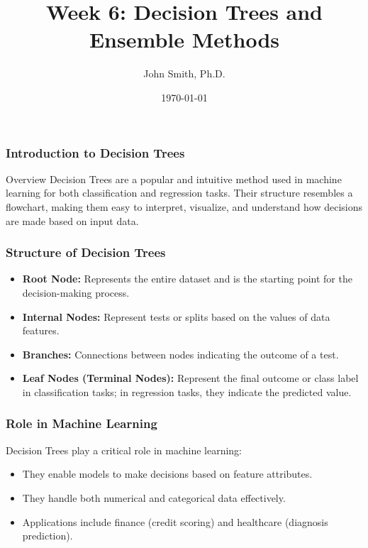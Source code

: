 \documentclass[aspectratio=169]{beamer}
\title[Decision Trees and Ensemble Methods]{Week 6: Decision Trees and Ensemble Methods}
\author[J. Smith]{John Smith, Ph.D.}
\institute[University Name]{
  Department of Computer Science\\
  University Name\\
  \vspace{0.3cm}
  Email: email@university.edu\\
  Website: www.university.edu
}
\date{\today}
\begin{document}
\frame{\titlepage}

\begin{frame}[fragile]
    \frametitle{Introduction to Decision Trees}
    \begin{block}{Overview}
        Decision Trees are a popular and intuitive method used in machine learning for both classification and regression tasks. Their structure resembles a flowchart, making them easy to interpret, visualize, and understand how decisions are made based on input data.
    \end{block}
\end{frame}

\begin{frame}[fragile]
    \frametitle{Structure of Decision Trees}
    \begin{itemize}
        \item \textbf{Root Node:} Represents the entire dataset and is the starting point for the decision-making process.
        \item \textbf{Internal Nodes:} Represent tests or splits based on the values of data features.
        \item \textbf{Branches:} Connections between nodes indicating the outcome of a test.
        \item \textbf{Leaf Nodes (Terminal Nodes):} Represent the final outcome or class label in classification tasks; in regression tasks, they indicate the predicted value.
    \end{itemize}
\end{frame}

\begin{frame}[fragile]
    \frametitle{Role in Machine Learning}
    Decision Trees play a critical role in machine learning:
    \begin{itemize}
        \item They enable models to make decisions based on feature attributes.
        \item They handle both numerical and categorical data effectively.
        \item Applications include finance (credit scoring) and healthcare (diagnosis prediction).
    \end{itemize}
\end{frame}
\end{document}
